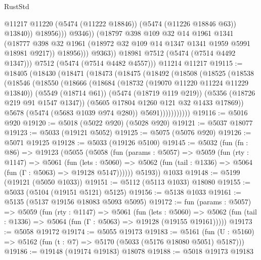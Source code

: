 \begin{lexlean}{RustStd}
\begin{coremodule}
                              @11217
                              @11220
                              (@5474 (@11222 @18846))
                              (@5474 (@11226 @18846 @63))
                              @13840))
                          @18956)))
                    @9346))
                (@18797
                  @398
                  @109
                  @32
                  @14
                  @1961
                  @1341
                  (@18777 @398 @32 @1961 (@18972 @32 @109 @14 @1347 @1341 @1959 @5991 @18981 @9217))
                  @18956)))
            @9363))
        @18981
        @7512
        (@5474 (@7514 @4492 @1347)))
      @7512
      (@5474 (@7514 @4482 @4557)))
    @11214
    @11217
@19115 := @18405
    (@18430
      (@18471
        (@18473
          (@18475
            (@18492
              (@18508
                (@18525
                  (@18538
                    (@18546
                      (@18550
                        (@18666
                          (@18684
                            (@18732 (@19070 @11220 @11224 @11229 @13840))
                            (@5549 (@18714 @61))
                            (@5474 (@18719 @119 @219))
                            (@5356 (@18726 @219 @91 @1547 @1347))
                            (@5605 @17804 @1260 @121 @32 @1433 @17869))
                          @5678
                          (@5474 (@5683 @1039 @974 @280))
                          @5691)))))))))))
@19116 := @5016 @920
@19120 := @5018 (@5022 @920) (@5028 @920)
@19121 := @5037 @18077
@19123 := @5033 (@19121 @5052)
@19125 := @5075 (@5076 @920)
@19126 := @5071 @19125
@19128 := @5033 (@19126 @5100)
@19145 := @5032
    (fun (fn : @86) =>
    @19123
      (@5055
        (@5058
          (fun (params : @5057) =>
          @5059
            (fun (rty : @1147) =>
            @5061
              (fun (lets : @5060) =>
              @5062 (fun (tail : @1336) => @5064 (fun (Γ : @5063) => @19128 @5147))))))
        @5193))
    @1033
@19148 := @5199 (@19121 (@5050 @1033))
@19151 := @5112 (@5113 @1033) @18080
@19155 := @5033 (@5104 (@19151 @5121) @5125)
@19156 := @5138 @1033
@19161 := @5135 (@5137 @19156 @18083 @5093 @5095)
@19172 := fun (params : @5057) =>
  @5059
    (fun (rty : @1147) =>
    @5061
      (fun (lets : @5060) =>
      @5062 (fun (tail : @1336) => @5064 (fun (Γ : @5063) => @19128 (@19155 @19161)))))
@19173 := @5058 @19172
@19174 := @5055 @19173
@19183 := @5161
    (fun (U : @5160) => @5162 (fun (t : @7) => @5170 (@5033 (@5176 @18080 @5051) @5187)))
@19186 := @19148 (@19174 @19183) @18078
@19188 := @5018 @19173 @19183

\end{coremodule}
\end{lexlean}
